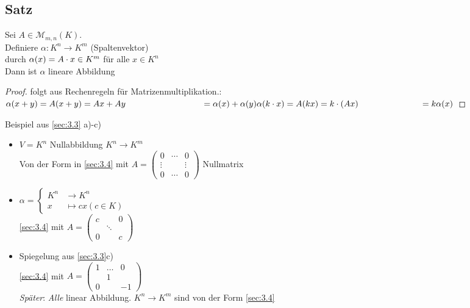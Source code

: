\subsection{Satz}\label{sec:\thesubsection}
Sei $A \in \mathcal{M}_{m,n}(K)$.\\
Definiere $\alpha : K^n \to K^m$ (Spaltenvektor)\\
durch $\alpha(x) = A \cdot x \in K^m$ für alle $x \in K^n$\\
Dann ist $\alpha$ lineare Abbildung
\begin{proof}
folgt aus Rechenregeln für Matrizenmultiplikation.:\\
$\alpha(x+y) = A(x+y) =  Ax + Ay\\
\phantom{\alpha(x+y) = A(x+y)}= \alpha(x) + \alpha(y)\\
\alpha(k \cd x) = A(kx) = k \cd (Ax)\\
\phantom{\alpha(k \cd x) = A(kx)}= k \alpha(x)$
\end{proof}
Beispiel aus \ref{sec:3.3} a)-c)
\begin{itemize}
\item $V = K^n$ Nullabbildung $K^n \to K^m$\\
Von der Form in \ref{sec:3.4} mit $A = \begin{pmatrix}
0&\cdots&0\\
\vdots&&\vdots\\
0&\cdots&0
\end{pmatrix}$ Nullmatrix
\item $\alpha = \begin{cases}
K^n &\to K^n\\
x &\mapsto cx (c \in K)
\end{cases}$\\
\ref{sec:3.4} mit $ A = \begin{pmatrix}
c&&0\\
&\ddots&\\
0&&c
\end{pmatrix}$\\
\item Spiegelung aus \ref{sec:3.3}c)\\
\ref{sec:3.4} mit $A = \begin{pmatrix}
1&\ldots&0\\
&1&\\
0&&-1
\end{pmatrix}$\\
\emph{Später}: \emph{Alle} linear Abbildung. $K^n \to K^m$ sind von der Form \ref{sec:3.4}
\end{itemize}
